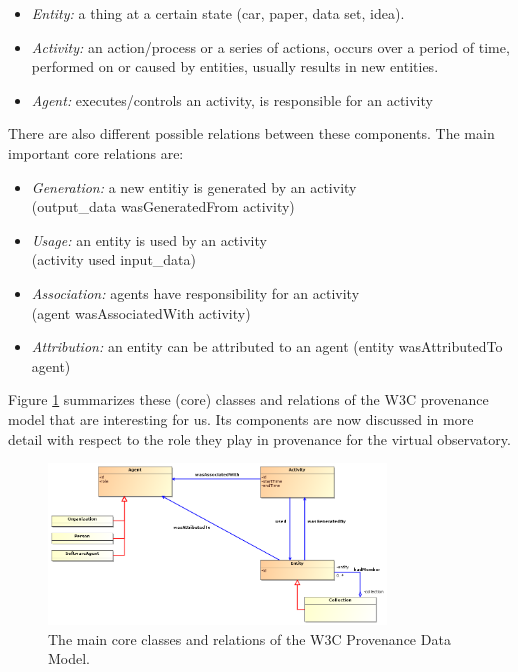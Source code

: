 \documentclass[11pt,a4paper]{ivoa}
\begin{document}
\begin{itemize}

\item \emph{Entity:} a thing at a certain state (car, paper, data set, idea).

\item \emph{Activity:} an action/process or a series of actions, occurs over a period of time, performed on or caused by entities, usually results in new entities.

\item \emph{Agent:} executes/controls an activity, is responsible for an activity
\end{itemize}

\noindent
There are also different possible relations between these components. The main important core relations are:
\begin{itemize}
\item \emph{Generation:} a new entitiy is generated by an activity\\
		(output\_data wasGeneratedFrom activity)
\item \emph{Usage:} an entity is used by an activity\\
		(activity used input\_data)
\item \emph{Association:} agents have responsibility for an activity\\
 		(agent wasAssociatedWith activity)
\item \emph{Attribution:} an entity can be attributed to an agent (entity wasAttributedTo agent)
\end{itemize}

Figure \ref{fig:w3cclasses} summarizes these (core) classes and relations of the W3C provenance model that are interesting for us.
Its components are now discussed in more detail with respect to the role they play in provenance for the virtual observatory.

\begin{figure}
\centering
\includegraphics[width=0.8\textwidth]{ProvDM-W3C-classdiagram.png}
\caption{The main core classes and relations of the W3C Provenance Data Model.}
\label{fig:w3cclasses}
\end{figure}
\end{document}
